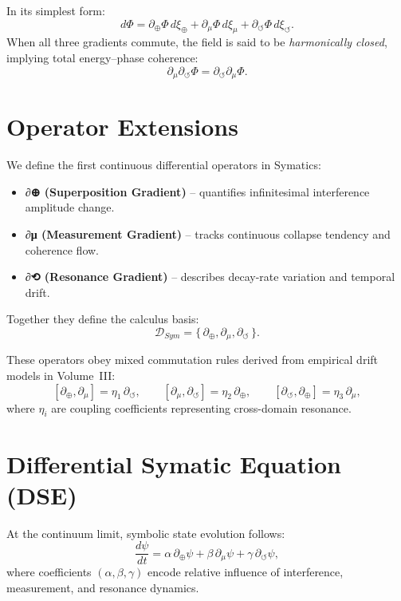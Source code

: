 \documentclass[11pt]{article}
\begin{document}
In its simplest form:
\[
d\Phi = \partial_\oplus \Phi\, d\xi_\oplus
      + \partial_\mu \Phi\, d\xi_\mu
      + \partial_\circlearrowleft \Phi\, d\xi_\circlearrowleft.
\]
When all three gradients commute, the field is said to be \emph{harmonically closed}, implying total energy–phase coherence:
\[
\partial_\mu \partial_\circlearrowleft \Phi
= \partial_\circlearrowleft \partial_\mu \Phi.
\]

\section{Operator Extensions}
We define the first continuous differential operators in Symatics:

\begin{itemize}
  \item \textbf{∂⊕ (Superposition Gradient)} – quantifies infinitesimal interference amplitude change.
  \item \textbf{∂μ (Measurement Gradient)} – tracks continuous collapse tendency and coherence flow.
  \item \textbf{∂⟲ (Resonance Gradient)} – describes decay-rate variation and temporal drift.
\end{itemize}

Together they define the calculus basis:
\[
\mathcal{D}_{Sym} = \{\,\partial_\oplus, \partial_\mu, \partial_\circlearrowleft\,\}.
\]

These operators obey mixed commutation rules derived from empirical drift models in Volume~III:
\[
[\partial_\oplus, \partial_\mu] = \eta_1\,\partial_\circlearrowleft,
\qquad
[\partial_\mu, \partial_\circlearrowleft] = \eta_2\,\partial_\oplus,
\qquad
[\partial_\circlearrowleft, \partial_\oplus] = \eta_3\,\partial_\mu,
\]
where $\eta_i$ are coupling coefficients representing cross-domain resonance.

\section{Differential Symatic Equation (DSE)}
At the continuum limit, symbolic state evolution follows:
\[
\frac{d\psi}{dt}
  = \alpha\,\partial_\oplus \psi
  + \beta\,\partial_\mu \psi
  + \gamma\,\partial_\circlearrowleft \psi,
\]
where coefficients $(\alpha,\beta,\gamma)$ encode relative influence of interference, measurement, and resonance dynamics.
\end{document}
